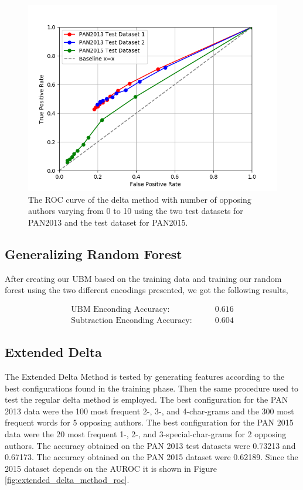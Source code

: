 \begin{figure}
    \centering
    \includegraphics[width=.7\textwidth]{./pictures/delta_method_roc.png}
    \caption{The ROC curve of the delta method with number of opposing authors
    varying from 0 to 10 using the two test datasets for PAN2013 and the test
    dataset for PAN2015.}
    \label{fig:delta_method_roc}
\end{figure}

\subsection{Generalizing Random Forest}
After creating our \gls{UBM} based on the training data and training our random
forest using the two different encodings presented, we got the following
results,

\begin{align}
\text{UBM Enconding Accuracy}:&\qquad 0.616\\
\text{Subtraction Enconding Accuracy}:& \qquad 0.604
\end{align}

\subsection{Extended Delta}
The Extended Delta Method is tested by generating features according to the best
configurations found in the training phase. Then the same procedure used to test
the regular delta method is employed. The best configuration for the PAN 2013
data were the 100 most frequent 2-, 3-, and 4-char-grams and the 300 most
frequent words for 5 opposing authors. The best configuration for the PAN 2015
data were the 20 most frequent 1-, 2-, and 3-special-char-grams for 2 opposing
authors. The accuracy obtained on the PAN 2013 test datasets were 0.73213 and
0.67173. The accuracy obtained on the PAN 2015 dataset were 0.62189. Since the
2015 dataset depends on the \gls{AUROC} it is shown in Figure
\ref{fig:extended_delta_method_roc}.


